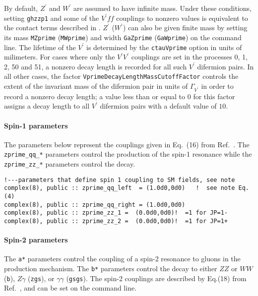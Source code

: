 \documentclass[aps,superscriptaddress,nofootinbib]{revtex4}
\begin{document}
By default, $Z^\prime$ and $W^\prime$ are assumed to have infinite mass.  Under these conditions, setting \verb|ghzzp1| and  some of the $V^\prime ff$ couplings to nonzero values is equivalent to the contact terms described in \cite{Gonzalez-Alonso:2014eva}.  $Z^\prime$ ($W^\prime$) can also be given finite mass by setting its mass \verb|MZprime| (\verb|MWprime|) and width \verb|GaZprime| (\verb|GaWprime|) on the command line. The lifetime of the $V^\prime$ is determined by the \verb|ctauVprime| option in units of milimeters. For cases where only the $V^\prime V^\prime$ couplings are set in the processes 0, 1, 2, 50 and 51, a nonzero decay length is recorded for all such $V^\prime$ difermion pairs. In all other cases, the factor \verb|VprimeDecayLengthMassCutoffFactor| controls the extent of the invariant mass of the difermion pair in units of $\Gamma_{V^\prime}$ in order to record a nonzero decay length; a value less than or equal to $0$ for this factor assigns a decay length to all $V^\prime$ difermion pairs with a default value of $10$.

\paragraph{Spin-1 parameters}
\label{spin1}

The parameters below represent the couplings given in Eq.~(16) from Ref.~\cite{Bolognesi:2012}. The \verb|zprime_qq_*| parameters control the production of the spin-1 resonance while the \verb|zprime_zz_*| parameters control the decay.

\begin{verbatim}
!---parameters that define spin 1 coupling to SM fields, see note
complex(8), public :: zprime_qq_left  = (1.0d0,0d0)   !  see note Eq. (4)
complex(8), public :: zprime_qq_right = (1.0d0,0d0)
complex(8), public :: zprime_zz_1 =  (0.0d0,0d0)!  =1 for JP=1-
complex(8), public :: zprime_zz_2 =  (0.0d0,0d0)!  =1 for JP=1+
\end{verbatim}

\paragraph{Spin-2 parameters}
\label{spin2}

\noindent
The \verb|a*| parameters control the coupling of a spin-2 resonance to gluons in the production mechanism.  The \verb|b*| parameters control the decay to either $ZZ$ or $WW$ (\verb|b|), $Z\gamma$ (\verb|zgs|), or $\gamma\gamma$ (\verb|gsgs|).
The spin-2 couplings are described by Eq.(18) from Ref.~\cite{Bolognesi:2012}, and can be set on the command line.
\end{document}
